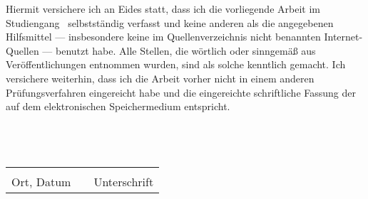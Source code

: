 Hiermit versichere ich an Eides statt, dass ich die vorliegende Arbeit im Studiengang \studycourse ~selbstständig verfasst und keine anderen als die angegebenen Hilfsmittel --- insbesondere keine im Quellenverzeichnis nicht benannten Internet-Quellen --- benutzt habe. Alle Stellen, die wörtlich oder sinngemäß aus Veröffentlichungen entnommen wurden, sind als solche kenntlich gemacht. Ich versichere weiterhin, dass ich die Arbeit vorher nicht in einem anderen Prüfungsverfahren eingereicht habe und die eingereichte schriftliche Fassung der auf dem elektronischen Speichermedium entspricht.
\\
\\
\\
\\

\begin{tabular}{lp{2em}l}
 \hspace{3cm}   && \hspace{3cm} \\\cline{1-1}\cline{3-3}
 Ort, Datum     && Unterschrift
\end{tabular}